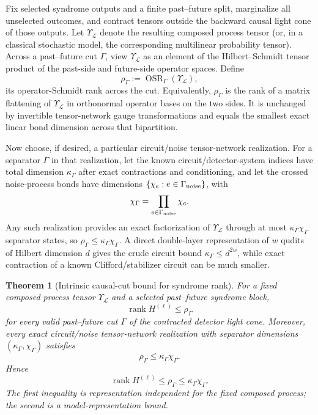 \documentclass[11pt]{article}
\newtheorem{theorem}{Theorem}
\newcommand{\rank}{\operatorname{rank}}
\begin{document}
Fix selected syndrome outputs and a finite past--future split, marginalize all unselected outcomes, and contract tensors outside the backward causal light cone of those outputs. Let $\Upsilon_{\mathcal L}$ denote the resulting composed process tensor (or, in a classical stochastic model, the corresponding multilinear probability tensor). Across a past--future cut $\Gamma$, view $\Upsilon_{\mathcal L}$ as an element of the Hilbert--Schmidt tensor product of the past-side and future-side operator spaces. Define
\begin{equation}
    \rho_\Gamma := \operatorname{OSR}_\Gamma(\Upsilon_{\mathcal L}),
    \label{eq:rhoGamma}
\end{equation}
its operator-Schmidt rank across the cut. Equivalently, $\rho_\Gamma$ is the rank of a matrix flattening of $\Upsilon_{\mathcal L}$ in orthonormal operator bases on the two sides. It is unchanged by invertible tensor-network gauge transformations and equals the smallest exact linear bond dimension across that bipartition.

Now choose, if desired, a particular circuit/noise tensor-network realization. For a separator $\Gamma$ in that realization, let the known circuit/detector-system indices have total dimension $\kappa_\Gamma$ after exact contractions and conditioning, and let the crossed noise-process bonds have dimensions $\{\chi_e:e\in\Gamma_{\rm noise}\}$, with
\begin{equation}
    \chi_\Gamma=\prod_{e\in\Gamma_{\rm noise}}\chi_e.
    \label{eq:chiGamma}
\end{equation}
Any such realization provides an exact factorization of $\Upsilon_{\mathcal L}$ through at most $\kappa_\Gamma\chi_\Gamma$ separator states, so $\rho_\Gamma\le\kappa_\Gamma\chi_\Gamma$. A direct double-layer representation of $w$ qudits of Hilbert dimension $d$ gives the crude circuit bound $\kappa_\Gamma\le d^{2w}$, while exact contraction of a known Clifford/stabilizer circuit can be much smaller.

\begin{theorem}[Intrinsic causal-cut bound for syndrome rank]
\label{thm:causalcut}
For a fixed composed process tensor $\Upsilon_{\mathcal L}$ and a selected past--future syndrome block,
\begin{equation}
    \boxed{\rank H^{(\ell)}\le \rho_\Gamma}
    \label{eq:intrinsiccut}
\end{equation}
for every valid past--future cut $\Gamma$ of the contracted detector light cone. Moreover, every exact circuit/noise tensor-network realization with separator dimensions $(\kappa_\Gamma,\chi_\Gamma)$ satisfies
\begin{equation}
    \boxed{\rho_\Gamma\le \kappa_\Gamma\chi_\Gamma.}
    \label{eq:causalcut}
\end{equation}
Hence
\begin{equation}
    \rank H^{(\ell)}\le \rho_\Gamma\le\kappa_\Gamma\chi_\Gamma.
    \label{eq:twolayercut}
\end{equation}
The first inequality is representation independent for the fixed composed process; the second is a model-representation bound.
\end{theorem}
\end{document}
